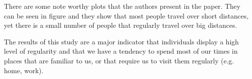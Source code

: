 There are some note worthy plots that the authors present in the paper. They can
be seen in figure{} and they show that most people travel over short distances,
yet there is a small number of people that regularly travel over big distances.

The results of this study are a major indicator that individuals display a high
level of regularity and that we have a tendency to spend most of our times in
places that are familiar to us, or that require us to visit them regularly
(e.g. home, work).





